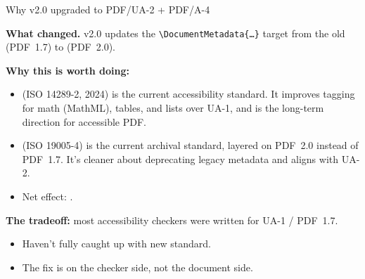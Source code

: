 \begin{frame}{Why v2.0 upgraded to PDF/UA-2 + PDF/A-4}

\textbf{What changed.} v2.0 updates the \texttt{\textbackslash DocumentMetadata\{\ldots\}} target from the old  (PDF~1.7) to  (PDF~2.0).

\bigskip

\textbf{Why this is worth doing:}
\begin{itemize}
\item {} (ISO 14289-2, 2024) is the current accessibility standard. It improves tagging for math (MathML), tables, and lists over UA-1, and is the long-term direction for accessible PDF.
\item {} (ISO 19005-4) is the current archival standard, layered on PDF~2.0 instead of PDF~1.7. It's cleaner about deprecating legacy metadata and aligns with UA-2.
\item Net effect: .
\end{itemize}

\bigskip

\textbf{The tradeoff:} most accessibility checkers were written for UA-1 / PDF~1.7.
\begin{itemize}
\item  Haven't fully caught up with new standard.
\item The fix is on the checker side, not the document side.
\end{itemize}  

\end{frame}

